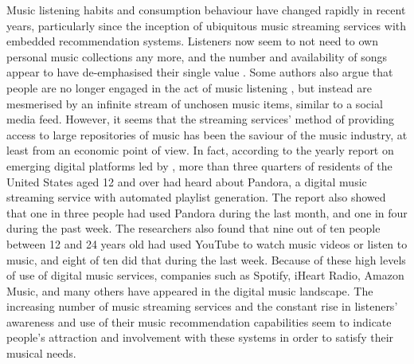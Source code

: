 Music listening habits and consumption behaviour have changed rapidly in recent years, particularly since the inception of ubiquitous music streaming services with embedded recommendation systems. Listeners now seem to not need to own personal music collections any more, and the number and availability of songs appear to have de-emphasised their single value \autocite{celma08music}. 
Some authors also argue that people are no longer engaged in the act of music listening \autocite{bick16collateral}, but instead are mesmerised by an infinite stream of unchosen music items, similar to a social media feed. 
However, it seems that the streaming services' method of providing access to large repositories of music has been the saviour of the music industry, at least from an economic point of view.
In fact, according to the yearly report on emerging digital platforms led by \textcite{infinitedial15}, more than three quarters of residents of the United States aged 12 and over had heard about Pandora, a digital music streaming service with automated playlist generation. The report also showed that one in three people had used Pandora during the last month, and one in four during the past week. The researchers also found that nine out of ten people between 12 and 24 years old had used YouTube to watch music videos or listen to music, and eight of ten did that during the last week.
Because of these high levels of use of digital music services,  companies such as Spotify, iHeart Radio, Amazon Music, and many others have appeared in the digital music landscape.
The increasing number of music streaming services and the constant rise in listeners' awareness and use of their music recommendation capabilities \autocite{infinitedial11, infinitedial12} seem to indicate people's attraction and involvement with these systems in order to satisfy their musical needs.





